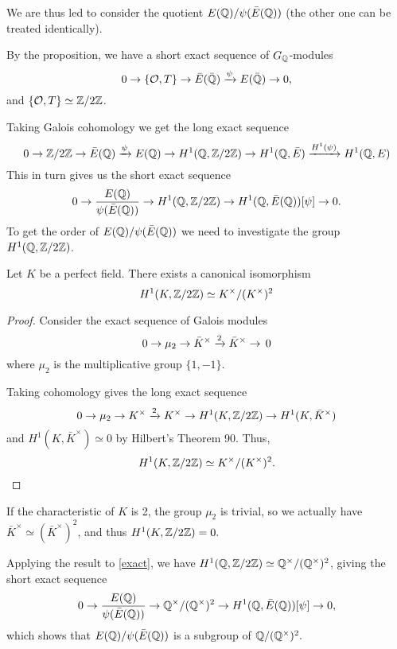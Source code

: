 \documentclass[12pt, a4paper]{report}
\begin{document}
We are thus led to consider the quotient $E({\mathbb Q}) / \psi(\bar{E}({\mathbb Q}))$ (the
other one can be treated identically).

By the proposition, we have a short exact sequence of $G_{{\mathbb Q}}$-modules
\[ 0 \rightarrow \{{\mathcal O}, T\} \rightarrow \bar{E}(\bar{{\mathbb Q}}) \xrightarrow[]{\psi}
  E(\bar{{\mathbb Q}})
  \rightarrow 0,\]
and $\{{\mathcal O}, T\} \simeq {\mathbb Z}/2{\mathbb Z}$.

Taking Galois cohomology we get the long exact sequence
\[ 0 \rightarrow {\mathbb Z} / 2{\mathbb Z} \rightarrow \bar{E}({\mathbb Q}) \xrightarrow[]{\psi} E({\mathbb Q})
  \rightarrow H^1({\mathbb Q}, {\mathbb Z}/2{\mathbb Z}) \rightarrow H^1({\mathbb Q}, \bar{E}) \xrightarrow{H^1(\psi)}
  H^1({\mathbb Q}, E)\]
This in turn gives us the short exact sequence
\begin{equation} \label{exact}
  0 \rightarrow \frac{E({\mathbb Q})}{\psi(\bar{E} ({\mathbb Q}))} \rightarrow
  H^1({\mathbb Q}, {\mathbb Z} / 2{\mathbb Z}) \rightarrow H^1({\mathbb Q}, \bar{E}({\mathbb Q}))[\psi] \rightarrow 0.
\end{equation}
To get the order of $E({\mathbb Q}) / \psi(\bar{E}({\mathbb Q}))$ we need to investigate the group
$H^1({\mathbb Q}, {\mathbb Z}/2{\mathbb Z})$.

\begin{prop}
  Let $K$ be a perfect field. There exists a canonical isomorphism
  \[H^1(K, {\mathbb Z}/2{\mathbb Z}) \simeq K^{\times} / (K^{\times})^2\]
\end{prop}
\begin{proof}
Consider the exact sequence of Galois modules
\[0 \rightarrow \mu_2 \rightarrow \bar{K}^{\times} \xrightarrow[]{2} \bar{K}^{\times} \rightarrow
  \, 0 \]
where $\mu_2$ is the multiplicative group $\{1, -1\}.$
 
Taking cohomology gives the long exact sequence
\[ 0 \rightarrow \mu_2 \rightarrow K^{\times} \xrightarrow[]{2} K^{\times} \rightarrow H^1(K, {\mathbb Z}/2{\mathbb Z})
  \rightarrow H^1(K, \bar{K}^{\times})\]
and $H^1(K, \bar{K}^{\times}) \simeq 0$ by Hilbert's Theorem 90. Thus,
\[H^1(K, {\mathbb Z}/2{\mathbb Z}) \simeq K^{\times}/(K^{\times})^2. \qedhere\]
\end{proof}

\begin{remark}
  If the characteristic of $K$ is 2, the group $\mu_2$ is trivial, so we
  actually have $\bar{K}^\times \simeq (\bar{K}^\times)^2$, and thus $H^1(K,
  {\mathbb Z}/2{\mathbb Z}) = 0.$
\end{remark}

Applying the result to \autoref{exact}, we have $H^1({\mathbb Q}, {\mathbb Z} / 2{\mathbb Z}) \simeq
{\mathbb Q}^\times / ({\mathbb Q}^\times)^2$, giving the short exact sequence
\[0 \rightarrow \frac{E({\mathbb Q})}{\psi({\bar{E}({\mathbb Q})})} \rightarrow {\mathbb Q}^\times / ({\mathbb Q}^\times)^2 \rightarrow
H^1({\mathbb Q}, \bar{E}({\mathbb Q}))[\psi] \rightarrow 0,\]
which shows that $E({\mathbb Q}) / \psi(\bar{E}({\mathbb Q}))$ is a subgroup of ${\mathbb Q} / ({\mathbb Q}^\times)^2.$
\end{document}

